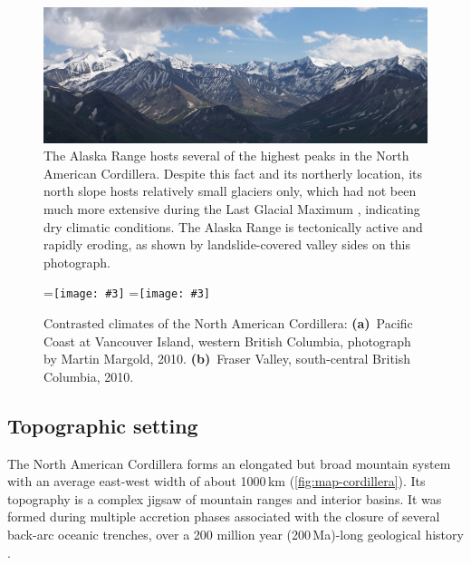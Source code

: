 \documentclass[a4paper]{kappa}
\newcommand{\subgraphics}[3][,]{%
  \setbox1=\hbox{\texttt{[image: \#3]}}%
  \leavevmode\rlap{\usebox1}%
  \rlap{\hspace*{0.25em}
        \raisebox{\dimexpr\ht1-3ex}{\textbf{(#2)}}}%
  \phantom{\usebox1}%
}
\begin{document}
\begin{figure}
  \includegraphics{photo-alaska-range}
  \caption{The Alaska Range hosts several of the highest peaks in the North
           American Cordillera. Despite this fact and its northerly location,
           its north slope hosts relatively small glaciers only, which had not
           been much more extensive during the Last Glacial Maximum
           \citep{Kaufman.Manley.2004}, indicating dry climatic conditions.
           The Alaska Range is tectonically active and rapidly eroding, as
           shown by landslide-covered valley sides on this photograph.}
  \label{fig:photo-alaska-range}
\end{figure}

\begin{figure}
  \subgraphics{a}{photo-vancouver-island}%
  \hspace{1cm}%
  \subgraphics{b}{photo-fraser-valley}%
  \caption{Contrasted climates of the North American Cordillera:
           \textbf{(a)}~Pacific Coast at Vancouver Island, western British
           Columbia, photograph by Martin Margold, 2010.
           \textbf{(b)}~Fraser Valley, south-central British Columbia, 2010.}
  \label{fig:photo-fraser-valley}
\end{figure}

\subsection{Topographic setting}

The North American Cordillera forms an elongated but broad mountain system with
an average east-west width of about 1000\,km (\cref{fig:map-cordillera}). Its
topography is a complex jigsaw of mountain ranges and interior basins. It was
formed during multiple accretion phases associated with the closure of several
back-arc oceanic trenches, over a 200 million year (200\,Ma)-long geological
history \citep{Sigloch.Mihalynuk.2013}.
\end{document}
